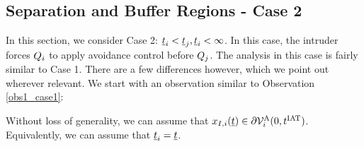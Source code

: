 \subsection{Separation and Buffer Regions - Case 2} \label{sec:case2}
In this section, we consider Case 2: $\underline{t}_i < \underline{t}_j, \underline{t}_i <\infty$. In this case, the intruder forces $Q_i$ to apply avoidance control before $Q_j$. The analysis in this case is fairly similar to Case 1. There are a few differences however, which we point out wherever relevant. We start with an observation similar to Observation \ref{obs1_case1}:
\begin{observation} \label{obs1_case2}
Without loss of generality, we can assume that $x_{I, i}(\underline{t}) \in \partial \mathcal{V}^{\text{A}}_{i}(0, t^\text{IAT})$. Equivalently, we can assume that $\underline{t}_i = \underline{t}$.
\end{observation}
